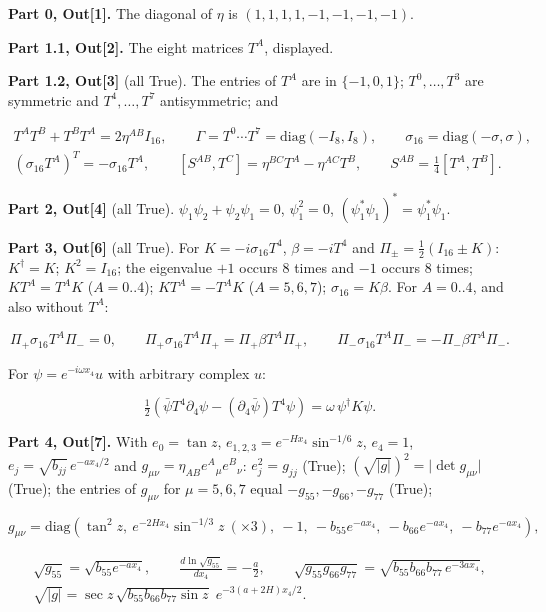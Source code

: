 \documentclass[10pt]{article}
\makeatletter
\newcommand\keepnext{\par\nopagebreak\@nobreaktrue\everypar{\@nobreakfalse\everypar{}}}
\makeatother
\begin{document}
\textbf{Part 0, Out[1].} The diagonal of $\eta$ is $(1,1,1,1,-1,-1,-1,-1)$.


\textbf{Part 1.1, Out[2].} The eight matrices $T^A$, displayed.


\textbf{Part 1.2, Out[3]} (all True). The entries of $T^A$ are in $\{-1, 0, 1\}$; $T^0, \dots, T^3$ are symmetric and $T^4, \dots, T^7$ antisymmetric; and\keepnext


\[
\begin{gathered}
T^AT^B + T^BT^A = 2\eta^{AB}I_{16}, \qquad \Gamma = T^0\cdots T^7 = \mathrm{diag}(-I_8, I_8), \qquad \sigma_{16} = \mathrm{diag}(-\sigma, \sigma), \\
(\sigma_{16}T^A)^T = -\sigma_{16}T^A, \qquad [S^{AB}, T^C] = \eta^{BC}T^A - \eta^{AC}T^B, \qquad S^{AB} = \tfrac14[T^A, T^B].
\end{gathered}
\]

\textbf{Part 2, Out[4]} (all True). $\psi_1\psi_2 + \psi_2\psi_1 = 0$, $\psi_1^2 = 0$, $(\psi_1^*\psi_1)^* = \psi_1^*\psi_1$.


\textbf{Part 3, Out[6]} (all True). For $K = -i\sigma_{16}T^4$, $\beta = -iT^4$ and $\Pi_\pm = \frac12(I_{16} \pm K)$: $K^\dagger = K$; $K^2 = I_{16}$; the eigenvalue $+1$ occurs 8 times and $-1$ occurs 8 times; $KT^A = T^AK$ ($A = 0..4$); $KT^A = -T^AK$ ($A = 5, 6, 7$); $\sigma_{16} = K\beta$. For $A = 0..4$, and also without $T^A$:\keepnext


\[
\Pi_+\sigma_{16}T^A\Pi_- = 0, \qquad \Pi_+\sigma_{16}T^A\Pi_+ = \Pi_+\beta T^A\Pi_+, \qquad \Pi_-\sigma_{16}T^A\Pi_- = -\Pi_-\beta T^A\Pi_- .
\]

For $\psi = e^{-i\omega x_4}u$ with arbitrary complex $u$:\keepnext


\[
\tfrac12\left(\bar\psi T^4\partial_4\psi - (\partial_4\bar\psi)T^4\psi\right) = \omega\,\psi^\dagger K\psi .
\]

\textbf{Part 4, Out[7].} With $e_0 = \tan z$, $e_{1,2,3} = e^{-Hx_4}\sin^{-1/6}z$, $e_4 = 1$, $e_j = \sqrt{b_{jj}}\,e^{-ax_4/2}$ and $g_{\mu\nu} = \eta_{AB}e^A{}_\mu e^B{}_\nu$: $e_j^2 = g_{jj}$ (True); $(\sqrt{\lvert g\rvert})^2 = \lvert\det g_{\mu\nu}\rvert$ (True); the entries of $g_{\mu\nu}$ for $\mu = 5, 6, 7$ equal $-g_{55}, -g_{66}, -g_{77}$ (True);\keepnext


\[
g_{\mu\nu} = \mathrm{diag}\left(\tan^2 z,\ e^{-2Hx_4}\sin^{-1/3}z\ (\times3),\ -1,\ -b_{55}e^{-ax_4},\ -b_{66}e^{-ax_4},\ -b_{77}e^{-ax_4}\right),
\]

\[
\begin{gathered}
\sqrt{g_{55}} = \sqrt{b_{55}e^{-ax_4}}, \qquad \frac{d\ln\sqrt{g_{55}}}{dx_4} = -\frac a2, \qquad \sqrt{g_{55}g_{66}g_{77}} = \sqrt{b_{55}b_{66}b_{77}\,e^{-3ax_4}}, \\
\sqrt{\lvert g\rvert} = \sec z\,\sqrt{b_{55}b_{66}b_{77}\sin z}\;e^{-3(a+2H)x_4/2} .
\end{gathered}
\]
\end{document}
